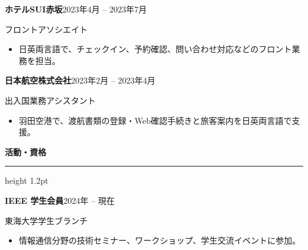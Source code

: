 \documentclass[9.5pt, a4paper]{article}
\newcommand{\rightsection}[1]{%
  \vspace{10pt}
  {\fontsize{11.5}{13.5}\selectfont\textcolor{sectioncolor}{\textbf{#1}}}\par
  \vspace{3pt}
  {\color{sectioncolor}\hrule height 1.2pt}\par
  \vspace{6pt}
}
\begin{document}
\begin{minipage}[t][0.96\textheight][t]{0.63\textwidth}
\begin{minipage}[t]{\linewidth}
    \noindent
    \begin{minipage}[t]{\linewidth}
      \textbf{\fontsize{9.5}{11.5}\selectfont ホテルSUI赤坂}\hfill\textcolor{bodycolor}{\fontsize{8}{10}\selectfont 2023年4月 -- 2023年7月}\par\vspace{2pt}
      \textcolor{bodycolor}{\fontsize{8.5}{11}\selectfont フロントアソシエイト}\par\vspace{2pt}
      \begin{itemize}[leftmargin=1.2em, itemsep=1pt, topsep=1pt, parsep=0pt]
        \fontsize{8.2}{11.5}\selectfont
        \item 日英両言語で、チェックイン、予約確認、問い合わせ対応などのフロント業務を担当。
      \end{itemize}
    \end{minipage}
    \vspace{6pt}

    \noindent
    \begin{minipage}[t]{\linewidth}
      \textbf{\fontsize{9.5}{11.5}\selectfont 日本航空株式会社}\hfill\textcolor{bodycolor}{\fontsize{8}{10}\selectfont 2023年2月 -- 2023年4月}\par\vspace{2pt}
      \textcolor{bodycolor}{\fontsize{8.5}{11}\selectfont 出入国業務アシスタント}\par\vspace{2pt}
      \begin{itemize}[leftmargin=1.2em, itemsep=1pt, topsep=1pt, parsep=0pt]
        \fontsize{8.2}{11.5}\selectfont
        \item 羽田空港で、渡航書類の登録・Web確認手続きと旅客案内を日英両言語で支援。
      \end{itemize}
    \end{minipage}
    \vspace{6pt}

    \vspace{6pt}
    \rightsection{活動・資格}
    
    \noindent
    \begin{minipage}[t]{\linewidth}
      \textbf{\fontsize{9.5}{11.5}\selectfont IEEE 学生会員}\hfill\textcolor{bodycolor}{\fontsize{8}{10}\selectfont 2024年 -- 現在}\par\vspace{2pt}
      \textcolor{bodycolor}{\fontsize{8.5}{11}\selectfont 東海大学学生ブランチ}\par\vspace{2pt}
      \begin{itemize}[leftmargin=1.2em, itemsep=1pt, topsep=1pt, parsep=0pt]
        \fontsize{8.2}{11.5}\selectfont
        \item 情報通信分野の技術セミナー、ワークショップ、学生交流イベントに参加。
      \end{itemize}
    \end{minipage}
    \vspace{6pt}
  \end{minipage}
\end{minipage}
\end{document}
